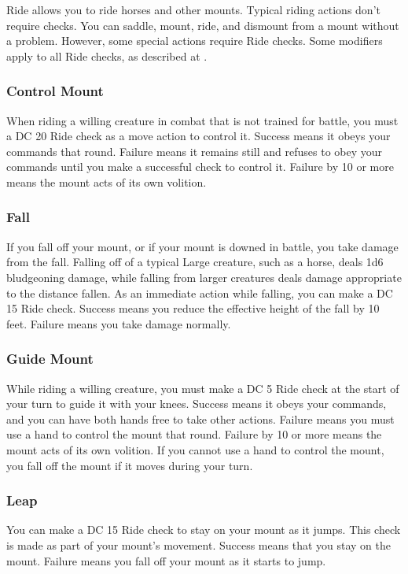 Ride allows you to ride horses and other mounts. Typical riding actions don't require checks. You can saddle, mount, ride, and dismount from a mount without a problem. However, some special actions require Ride checks. Some modifiers apply to all Ride checks, as described at .

\subsubsection{Control Mount}
When riding a willing creature in combat that is not trained for battle, you must a DC 20 Ride check as a move action to control it. Success means it obeys your commands that round. Failure means it remains still and refuses to obey your commands until you make a successful check to control it. Failure by 10 or more means the mount acts of its own volition.

\subsubsection{Fall}
If you fall off your mount, or if your mount is downed in battle, you take damage from the fall. Falling off of a typical Large creature, such as a horse, deals 1d6 bludgeoning damage, while falling from larger creatures deals damage appropriate to the distance fallen. As an immediate action while falling, you can make a DC 15 Ride check. Success means you reduce the effective height of the fall by 10 feet. Failure means you take damage normally. 

\subsubsection{Guide Mount}
While riding a willing creature, you must make a DC 5 Ride check at the start of your turn to guide it with your knees. Success means it obeys your commands, and you can have both hands free to take other actions. Failure means you must use a hand to control the mount that round. Failure by 10 or more means the mount acts of its own volition. If you cannot use a hand to control the mount, you fall off the mount if it moves during your turn.

\subsubsection{Leap}
You can make a DC 15 Ride check to stay on your mount as it jumps. This check is made as part of your mount's movement. Success means that you stay on the mount. Failure means you fall off your mount as it starts to jump.

